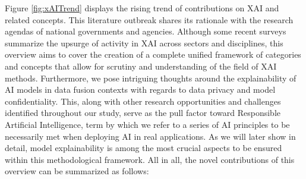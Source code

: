 \documentclass[final]{elsarticle}
\begin{document}
Figure \ref{fig:xAITrend} displays the rising trend of contributions on XAI and related concepts. This literature outbreak shares its rationale with the research agendas of national governments and agencies. Although some recent surveys \cite{1907.07374,Gilpin18,Dosilovic18,adadi2018peeking,biran2017explanation,Darpa2019,Guidotti19} summarize the upsurge of activity in XAI across sectors and disciplines, this overview aims to cover the creation of a complete unified framework of categories and concepts that allow for scrutiny and understanding of the field of XAI methods. Furthermore, we pose intriguing thoughts around the explainability of AI models in data fusion contexts with regards to data privacy and model confidentiality. This, along with other research opportunities and challenges identified throughout our study, serve as the pull factor toward {Responsible Artificial Intelligence}, term by which we refer to a series of AI principles to be necessarily met when deploying AI in real applications. As we will later show in detail, model explainability is among the most crucial aspects to be ensured within this methodological framework. All in all, the novel contributions of this overview can be summarized as follows:
\end{document}
